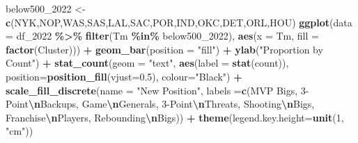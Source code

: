 \documentclass[
]{article}
\newenvironment{Shaded}{\begin{snugshade}}{\end{snugshade}}
\newcommand{\AttributeTok}[1]{\textcolor[rgb]{0.13,0.29,0.53}{#1}}
\newcommand{\DecValTok}[1]{\textcolor[rgb]{0.00,0.00,0.81}{#1}}
\newcommand{\FloatTok}[1]{\textcolor[rgb]{0.00,0.00,0.81}{#1}}
\newcommand{\FunctionTok}[1]{\textcolor[rgb]{0.13,0.29,0.53}{\textbf{#1}}}
\newcommand{\NormalTok}[1]{#1}
\newcommand{\OtherTok}[1]{\textcolor[rgb]{0.56,0.35,0.01}{#1}}
\newcommand{\SpecialCharTok}[1]{\textcolor[rgb]{0.81,0.36,0.00}{\textbf{#1}}}
\newcommand{\StringTok}[1]{\textcolor[rgb]{0.31,0.60,0.02}{#1}}
\begin{document}
\begin{Shaded}
\begin{Highlighting}[]
\NormalTok{below500\_2022 }\OtherTok{\textless{}{-}} \FunctionTok{c}\NormalTok{(}\StringTok{\textquotesingle{}NYK\textquotesingle{}}\NormalTok{,}\StringTok{\textquotesingle{}NOP\textquotesingle{}}\NormalTok{,}\StringTok{\textquotesingle{}WAS\textquotesingle{}}\NormalTok{,}\StringTok{\textquotesingle{}SAS\textquotesingle{}}\NormalTok{,}\StringTok{\textquotesingle{}LAL\textquotesingle{}}\NormalTok{,}\StringTok{\textquotesingle{}SAC\textquotesingle{}}\NormalTok{,}\StringTok{\textquotesingle{}POR\textquotesingle{}}\NormalTok{,}\StringTok{\textquotesingle{}IND\textquotesingle{}}\NormalTok{,}\StringTok{\textquotesingle{}OKC\textquotesingle{}}\NormalTok{,}\StringTok{\textquotesingle{}DET\textquotesingle{}}\NormalTok{,}\StringTok{\textquotesingle{}ORL\textquotesingle{}}\NormalTok{,}\StringTok{\textquotesingle{}HOU\textquotesingle{}}\NormalTok{)}
\FunctionTok{ggplot}\NormalTok{(}\AttributeTok{data =}\NormalTok{ df\_2022 }\SpecialCharTok{\%\textgreater{}\%} \FunctionTok{filter}\NormalTok{(Tm }\SpecialCharTok{\%in\%}\NormalTok{ below500\_2022), }\FunctionTok{aes}\NormalTok{(}\AttributeTok{x =}\NormalTok{ Tm, }\AttributeTok{fill =} \FunctionTok{factor}\NormalTok{(Cluster))) }\SpecialCharTok{+}
  \FunctionTok{geom\_bar}\NormalTok{(}\AttributeTok{position =} \StringTok{"fill"}\NormalTok{) }\SpecialCharTok{+} \FunctionTok{ylab}\NormalTok{(}\StringTok{"Proportion by Count"}\NormalTok{) }\SpecialCharTok{+}
  \FunctionTok{stat\_count}\NormalTok{(}\AttributeTok{geom =} \StringTok{"text"}\NormalTok{, }
             \FunctionTok{aes}\NormalTok{(}\AttributeTok{label =} \FunctionTok{stat}\NormalTok{(count)),}
             \AttributeTok{position=}\FunctionTok{position\_fill}\NormalTok{(}\AttributeTok{vjust=}\FloatTok{0.5}\NormalTok{), }\AttributeTok{colour=}\StringTok{"Black"}\NormalTok{) }\SpecialCharTok{+}
      \FunctionTok{scale\_fill\_discrete}\NormalTok{(}\AttributeTok{name =} \StringTok{"New Position"}\NormalTok{, }\AttributeTok{labels =}\FunctionTok{c}\NormalTok{(}\StringTok{\textquotesingle{}MVP Bigs\textquotesingle{}}\NormalTok{, }\StringTok{\textquotesingle{}3{-}Point}\SpecialCharTok{\textbackslash{}n}\StringTok{Backups\textquotesingle{}}\NormalTok{, }\StringTok{\textquotesingle{}Game}\SpecialCharTok{\textbackslash{}n}\StringTok{Generals\textquotesingle{}}\NormalTok{, }\StringTok{\textquotesingle{}3{-}Point}\SpecialCharTok{\textbackslash{}n}\StringTok{Threats\textquotesingle{}}\NormalTok{, }\StringTok{\textquotesingle{}Shooting}\SpecialCharTok{\textbackslash{}n}\StringTok{Bigs\textquotesingle{}}\NormalTok{, }\StringTok{\textquotesingle{}Franchise}\SpecialCharTok{\textbackslash{}n}\StringTok{Players\textquotesingle{}}\NormalTok{, }\StringTok{\textquotesingle{}Rebounding}\SpecialCharTok{\textbackslash{}n}\StringTok{Bigs\textquotesingle{}}\NormalTok{))  }\SpecialCharTok{+}
  \FunctionTok{theme}\NormalTok{(}\AttributeTok{legend.key.height=}\FunctionTok{unit}\NormalTok{(}\DecValTok{1}\NormalTok{, }\StringTok{"cm"}\NormalTok{))}
\end{Highlighting}
\end{Shaded}
\end{document}
